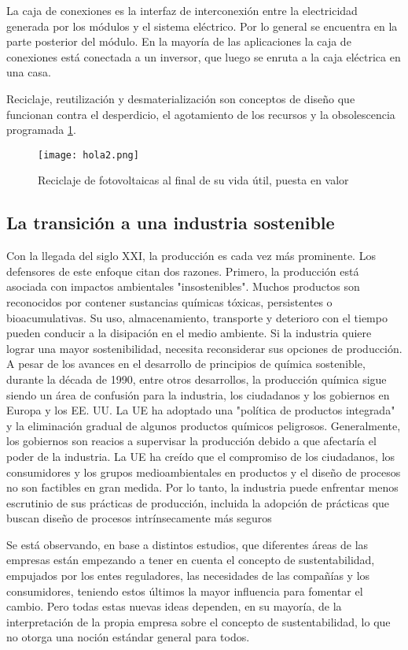 \documentclass[runningheads]{llncs}
\begin{document}
\bigskip
La caja de conexiones es la interfaz de interconexión entre la electricidad generada por los módulos y el sistema eléctrico. Por lo general se encuentra en la parte posterior del módulo. En la mayoría de las aplicaciones la caja de conexiones está conectada a un inversor, que luego se enruta a la caja eléctrica en una casa. 

\bigskip
Reciclaje, reutilización y desmaterialización son conceptos de diseño que funcionan contra el desperdicio, el agotamiento de los recursos y la obsolescencia programada \ref{hola2}.

\begin{figure}[htbp] %
  \texttt{[image: hola2.png]}
 \caption{Reciclaje de fotovoltaicas al final de su vida útil, puesta en valor}
 \label{hola2}
\end{figure}

\subsection{La transición a una industria sostenible}
\bigskip
Con la llegada del siglo XXI, la producción es cada vez más prominente. Los defensores de este enfoque citan dos razones. Primero, la producción está asociada con impactos ambientales "insostenibles". Muchos productos son reconocidos por contener sustancias químicas tóxicas, persistentes o bioacumulativas. Su uso, almacenamiento, transporte y deterioro con el tiempo pueden conducir a la disipación en el medio ambiente. Si la industria quiere lograr una mayor sostenibilidad, necesita reconsiderar sus opciones de producción. A pesar de los avances en el desarrollo de principios de química sostenible, durante la década de 1990, entre otros desarrollos, la producción química sigue siendo un área de confusión para la industria, los ciudadanos y los gobiernos en Europa y los EE. UU. La UE ha adoptado una "política de productos integrada" y la eliminación gradual de algunos productos químicos peligrosos. Generalmente, los gobiernos son reacios a supervisar la producción debido a que afectaría el poder de la industria. La UE ha creído que el compromiso de los ciudadanos, los consumidores y los grupos medioambientales en productos y el diseño de procesos no son factibles en gran medida. Por lo tanto, la industria puede enfrentar menos escrutinio de sus prácticas de producción, incluida la adopción de prácticas que buscan diseño de procesos intrínsecamente más seguros

\bigskip
Se está observando, en base a distintos estudios, que diferentes áreas de las empresas están empezando a tener en cuenta el concepto de sustentabilidad, empujados por los entes reguladores, las necesidades de las compañías y los consumidores, teniendo estos últimos la mayor influencia para fomentar el cambio. Pero todas estas nuevas ideas dependen, en su mayoría, de la interpretación de la propia empresa sobre el concepto de sustentabilidad, lo que no otorga una noción estándar general para todos.
\end{document}
